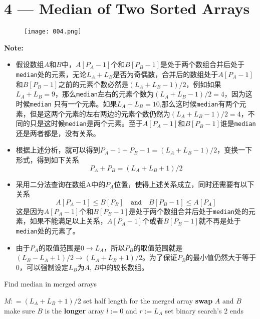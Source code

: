 \documentclass[a4paper,12pt]{article}
\begin{document}
\section{4 --- Median of Two Sorted Arrays}
\begin{figure}[H]
	\begin{center}
		\texttt{[image: 004.png]}
	\end{center}
\end{figure}
\textbf{\large{Note:}}
\par
\vspace{0.5em}
\begin{CJK*}{UTF8}{gbsn}
\begin{itemize}
\item 假设数组$A$和$B$中，$A[P_A-1]$个和$B[P_B-1]$是处于两个数组合并后处于\texttt{median}处的元素，无论$L_A+L_B$是否为奇偶数，合并后的数组处于$A[P_A-1]$和$B[P_B-1]$之前的元素个数必然是$(L_A+L_B-1)/2$，例如如果$L_A+L_B = 9$，那么\texttt{median}左右的元素个数为$(L_A+L_B-1)/2=4$，因为这时候\texttt{median} 只有一个元素。如果$L_A+L_B = 10$,那么这时候\texttt{median}有两个元素，但是这两个元素的左右两边的元素个数仍然为$(L_A+L_B-1)/2=4$，不同的只是这时候\texttt{median}是两个元素。至于$A[P_A-1]$和$B[P_B-1]$谁是\texttt{median}还是两者都是，没有关系。
\item 根据上述分析，就可以得到$P_A-1+P_B-1 =(L_A+L_B-1)/2 $，变换一下形式，得到如下关系
\[
P_A + P_B = (L_A+L_B+1)/2
\]
\item 采用二分法查询在数组A中的$P_A$位置，使得上述关系成立，同时还需要有以下关系
\[
A[P_A - 1] \leq B[P_B] \quad \mathtt{and} \quad B[P_B - 1] \leq A[P_A]
\]
这是因为$A[P_A-1]$个和$B[P_B-1]$是处于两个数组合并后处于\texttt{median}处的元素，如果不能满足以上关系，$A[P_A-1]$个或者$B[P_B-1]$就不再是处于\texttt{median}处的元素了。
\item 由于$P_A$的取值范围是$0\to L_A$，所以$P_B$的取值范围就是$(L_B-L_A+1)/2 \to (L_A+L_B+1)/2$。为了保证$P_B$的最小值仍然大于等于0，可以强制设定$L_B$为$A$, $B$中的较长数组。
\end{itemize}
\clearpage
\end{CJK*}
\setcounter{algorithm}{0}
\begin{algorithm}[H]
\caption{Find median in merged arrays}
\begin{algorithmic}[1]
\Statex
{}
\State $M: = (L_A + L_B + 1)/2$ \Comment set half length for the merged array
\State \textbf{swap} $A$ and $B$ \Comment make sure $B$ is the \textbf{longer} array
\EndIf
\State $l := 0$ and $r:=L_A$ \Comment set binary search's 2 ends

\end{algorithmic}
\end{algorithm}
\end{document}
